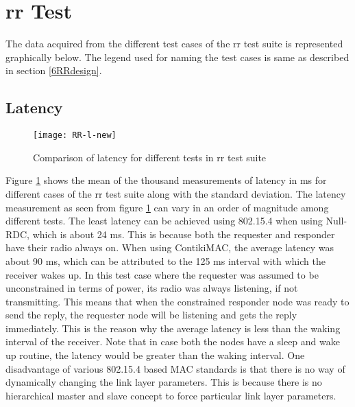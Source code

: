 \section{\texorpdfstring{\acrlong{rr}}{Request-Response} Test}
The data acquired from the different test cases of the \gls{rr} test suite is represented graphically below. The legend used for naming the test cases is same as described in section \ref{6RRdesign}.

\subsection{Latency}

\begin{figure}[!b]
\texttt{[image: RR-l-new]}
\caption{Comparison of latency for different tests in \gls{rr} test suite}
\label{fig:RR-l}
\end{figure}

Figure \ref{fig:RR-l} shows the mean of the thousand measurements of latency in ms for different cases of the \gls{rr} test suite along with the standard deviation. 
The latency measurement as seen from figure \ref{fig:RR-l} can vary in an order of magnitude among different tests. The least latency can be achieved using 802.15.4 when using Null-RDC, which is about 24 ms. This is because both the requester and responder have their radio always on. When using ContikiMAC, the average latency was about 90 ms, which can be attributed to the 125 ms interval with which the receiver wakes up. In this test case where the requester was assumed to be unconstrained in terms of power, its radio was always listening, if not transmitting. This means that when the constrained responder node was ready to send the reply, the requester node will be listening and gets the reply immediately. This is the reason why the average latency is less than the waking interval of the receiver. Note that in case both the nodes have a sleep and wake up routine, the latency would be greater than the waking interval. One disadvantage of various 802.15.4 based MAC standards is that there is no way of dynamically changing the link layer parameters. This is because there is no hierarchical master and slave concept to force particular link layer parameters.

